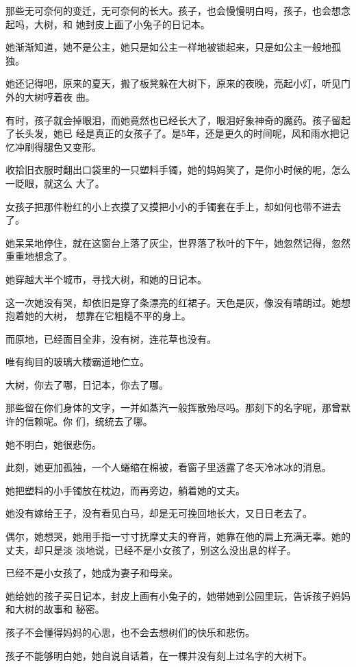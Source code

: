 		那些无可奈何的变迁，无可奈何的长大。孩子，也会慢慢明白吗，孩子，也会想念起吗，大树，和
	她封皮上画了小兔子的日记本。


		她渐渐知道，她不是公主，她只是如公主一样地被锁起来，只是如公主一般地孤独。

		她还记得吧，原来的夏天，搬了板凳躲在大树下，原来的夜晚，亮起小灯，听见门外的大树哼着夜
	曲。

		有时，孩子就会掉眼泪，而她竟然也已经长大了，眼泪好象神奇的魔药。孩子留起了长头发，她已
	经是真正的女孩子了。是5年，还是更久的时间呢，风和雨水把记忆冲刷得腿色又变形。

		收拾旧衣服时翻出口袋里的一只塑料手镯，她的妈妈笑了，是你小时候的呢，怎么一眨眼，就这么
	大了。

		女孩子把那件粉红的小上衣摸了又摸把小小的手镯套在手上，却如何也带不进去了。

		她呆呆地停住，就在这窗台上落了灰尘，世界落了秋叶的下午，她忽然记得，忽然重重地想念了。

		她穿越大半个城市，寻找大树，和她的日记本。

		这一次她没有哭，却依旧是穿了条漂亮的红裙子。天色是灰，像没有晴朗过。她想抱着她的大树，
	想靠在它粗糙不平的身上。

		而原地，已经面目全非，没有树，连花草也没有。

		唯有绚目的玻璃大楼霸道地伫立。


		大树，你去了哪，日记本，你去了哪。

		那些留在你们身体的文字，一并如蒸汽一般挥散殆尽吗。那刻下的名字呢，那曾默许的信赖呢。你
	们，统统去了哪。


		她不明白，她很悲伤。

		此刻，她更加孤独，一个人蜷缩在棉被，看窗子里透露了冬天冷冰冰的消息。

		她把塑料的小手镯放在枕边，而再旁边，躺着她的丈夫。

		她没有嫁给王子，没有看见白马，却是无可挽回地长大，又日日老去了。

		偶尔，她想哭，她用手指一寸寸抚摩丈夫的脊背，她靠在他的肩上充满无辜。她的丈夫，却只是淡
	淡地说，已经不是小女孩了，别这么没出息的样子。

		已经不是小女孩了，她成为妻子和母亲。

		她给她的孩子买日记本，封皮上画有小兔子的，她带她到公园里玩，告诉孩子妈妈和大树的故事和
	秘密。

		孩子不会懂得妈妈的心思，也不会去想树们的快乐和悲伤。

		孩子不能够明白她，她自说自话着，在一棵并没有刻上过名字的大树下。


